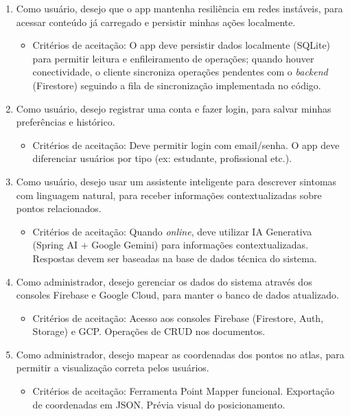 \begin{enumerate}
    \item Como usuário, desejo que o app mantenha resiliência em redes instáveis, para acessar conteúdo já carregado e persistir minhas ações localmente.
    \begin{itemize}
        \item Critérios de aceitação: O app deve persistir dados localmente (SQLite) para permitir leitura e enfileiramento de operações; quando houver conectividade, o cliente sincroniza operações pendentes com o \textit{backend} (Firestore) seguindo a fila de sincronização implementada no código.
    \end{itemize}
    
    \item Como usuário, desejo registrar uma conta e fazer login, para salvar minhas preferências e histórico.
    \begin{itemize}
        \item Critérios de aceitação: Deve permitir login com email/senha. O app deve diferenciar usuários por tipo (ex: estudante, profissional etc.).
    \end{itemize}
    
    \item Como usuário, desejo usar um assistente inteligente para descrever sintomas com linguagem natural, para receber informações contextualizadas sobre pontos relacionados.
    \begin{itemize}
        \item Critérios de aceitação: Quando \textit{online}, deve utilizar IA Generativa (Spring AI + Google Gemini) para informações contextualizadas. Respostas devem ser baseadas na base de dados técnica do sistema.
    \end{itemize}
    
    \item Como administrador, desejo gerenciar os dados do sistema através dos consoles Firebase e Google Cloud, para manter o banco de dados atualizado.
    \begin{itemize}
        \item Critérios de aceitação: Acesso aos consoles Firebase (Firestore, Auth, Storage) e GCP. Operações de CRUD nos documentos.
    \end{itemize}
    
    \item Como administrador, desejo mapear as coordenadas dos pontos no atlas, para permitir a visualização correta pelos usuários.
    \begin{itemize}
        \item Critérios de aceitação: Ferramenta Point Mapper funcional. Exportação de coordenadas em JSON. Prévia visual do posicionamento.
    \end{itemize}
\end{enumerate}


